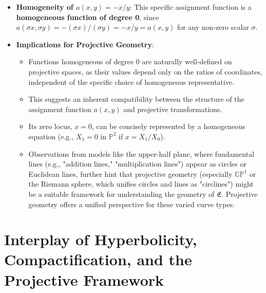 \documentclass{article}
\begin{document}
\begin{itemize}
    \item \textbf{Homogeneity of $a(x,y) = -x/y$}: This specific assignment function is a \textbf{homogeneous function of degree 0}, since $a(\sigma x, \sigma y) = -(\sigma x)/(\sigma y) = -x/y = a(x,y)$ for any non-zero scalar $\sigma$.
    \item \textbf{Implications for Projective Geometry}:
    \begin{itemize}
        \item Functions homogeneous of degree 0 are naturally well-defined on projective spaces, as their values depend only on the ratios of coordinates, independent of the specific choice of homogeneous representative.
        \item This suggests an inherent compatibility between the structure of the assignment function $a(x,y)$ and projective transformations.
        \item Its zero locus, $x=0$, can be concisely represented by a homogeneous equation (e.g., $X_1=0$ in $\mathbb{P}^2$ if $x=X_1/X_0$).
        \item Observations from models like the upper-half plane, where fundamental lines (e.g., "addition lines," "multiplication lines") appear as circles or Euclidean lines, further hint that projective geometry (especially $\mathbb{CP}^1$ or the Riemann sphere, which unifies circles and lines as "circlines") might be a suitable framework for understanding the geometry of $\mathfrak{E}$. Projective geometry offers a unified perspective for these varied curve types.
    \end{itemize}
\end{itemize}

\section{Interplay of Hyperbolicity, Compactification, and the Projective Framework}
\end{document}
